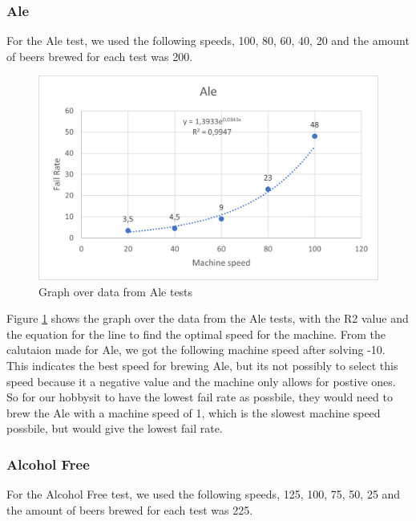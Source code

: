 \subsubsection{Ale}
For the Ale test, we used the following speeds, 100, 80, 60, 40, 20 and the amount of beers brewed for each test was 200.

\begin{center}
    \centering
    \begin{figure}[H]
        \includegraphics[width=1\textwidth]{img/Ale_graph.png}
        \caption{Graph over data from Ale tests}
        \label{fig:Ale_graph}
    \end{figure}
\end{center}

Figure \ref{fig:Ale_graph} shows the graph over the data from the Ale tests, with the R2 value and the equation for the line to find the optimal speed for the machine. \newline
From the calutaion made for Ale, we got the following machine speed after solving -10. This indicates the best speed for brewing Ale, but its not possibly to select this speed because it a negative value and the machine only allows for postive ones. 
So for our hobbysit to have the lowest fail rate as possbile, they would need to brew the Ale with a machine speed of 1, which is the slowest machine speed possbile, but would give the lowest fail rate. \newline


\subsubsection{Alcohol Free}
For the Alcohol Free test, we used the following speeds, 125, 100, 75, 50, 25 and the amount of beers brewed for each test was 225.

